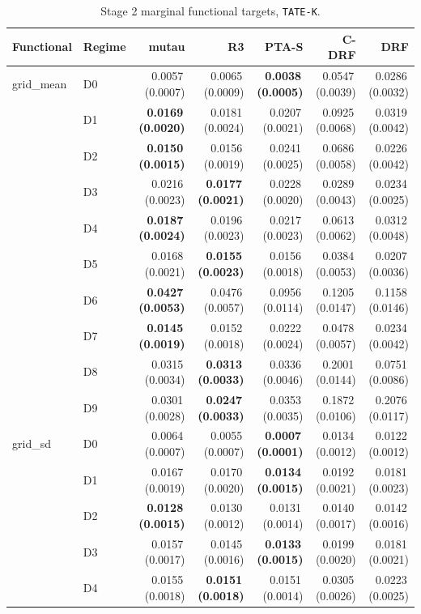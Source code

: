 \begin{table}[htbp]
\centering
\caption{Stage 2 marginal functional targets, \texttt{TATE-K}.}
\label{tab:p55s2-tate}
\scriptsize
\setlength{\tabcolsep}{3.2pt}
\begin{tabular}{@{}llrrrrr@{}}
\toprule
Functional & Regime & mutau & R3 & PTA-S & C-DRF & DRF \\
\midrule
grid\_mean & D0 & 0.0057\,(0.0007) & 0.0065\,(0.0009) & \textbf{0.0038\,(0.0005)} & 0.0547\,(0.0039) & 0.0286\,(0.0032) \\
 & D1 & \textbf{0.0169\,(0.0020)} & 0.0181\,(0.0024) & 0.0207\,(0.0021) & 0.0925\,(0.0068) & 0.0319\,(0.0042) \\
 & D2 & \textbf{0.0150\,(0.0015)} & 0.0156\,(0.0019) & 0.0241\,(0.0025) & 0.0686\,(0.0058) & 0.0226\,(0.0042) \\
 & D3 & 0.0216\,(0.0023) & \textbf{0.0177\,(0.0021)} & 0.0228\,(0.0020) & 0.0289\,(0.0043) & 0.0234\,(0.0025) \\
 & D4 & \textbf{0.0187\,(0.0024)} & 0.0196\,(0.0023) & 0.0217\,(0.0023) & 0.0613\,(0.0062) & 0.0312\,(0.0048) \\
 & D5 & 0.0168\,(0.0021) & \textbf{0.0155\,(0.0023)} & 0.0156\,(0.0018) & 0.0384\,(0.0053) & 0.0207\,(0.0036) \\
 & D6 & \textbf{0.0427\,(0.0053)} & 0.0476\,(0.0057) & 0.0956\,(0.0114) & 0.1205\,(0.0147) & 0.1158\,(0.0146) \\
 & D7 & \textbf{0.0145\,(0.0019)} & 0.0152\,(0.0018) & 0.0222\,(0.0024) & 0.0478\,(0.0057) & 0.0234\,(0.0042) \\
 & D8 & 0.0315\,(0.0034) & \textbf{0.0313\,(0.0033)} & 0.0336\,(0.0046) & 0.2001\,(0.0144) & 0.0751\,(0.0086) \\
 & D9 & 0.0301\,(0.0028) & \textbf{0.0247\,(0.0033)} & 0.0353\,(0.0035) & 0.1872\,(0.0106) & 0.2076\,(0.0117) \\
\midrule
grid\_sd & D0 & 0.0064\,(0.0007) & 0.0055\,(0.0007) & \textbf{0.0007\,(0.0001)} & 0.0134\,(0.0012) & 0.0122\,(0.0012) \\
 & D1 & 0.0167\,(0.0019) & 0.0170\,(0.0020) & \textbf{0.0134\,(0.0015)} & 0.0192\,(0.0021) & 0.0181\,(0.0023) \\
 & D2 & \textbf{0.0128\,(0.0015)} & 0.0130\,(0.0012) & 0.0131\,(0.0014) & 0.0140\,(0.0017) & 0.0142\,(0.0016) \\
 & D3 & 0.0157\,(0.0017) & 0.0145\,(0.0016) & \textbf{0.0133\,(0.0015)} & 0.0199\,(0.0020) & 0.0181\,(0.0021) \\
 & D4 & 0.0155\,(0.0018) & \textbf{0.0151\,(0.0018)} & 0.0151\,(0.0014) & 0.0305\,(0.0026) & 0.0223\,(0.0025) \\

\end{tabular}
\end{table}
